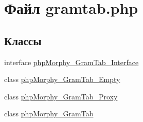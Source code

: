 \hypertarget{gramtab_8php}{
\section{Файл gramtab.php}
\label{gramtab_8php}
}
\subsection*{Классы}
\begin{DoxyCompactItemize}
\item 
interface \hyperlink{interfacephpMorphy__GramTab__Interface}{phpMorphy\_\-GramTab\_\-Interface}
\item 
class \hyperlink{classphpMorphy__GramTab__Empty}{phpMorphy\_\-GramTab\_\-Empty}
\item 
class \hyperlink{classphpMorphy__GramTab__Proxy}{phpMorphy\_\-GramTab\_\-Proxy}
\item 
class \hyperlink{classphpMorphy__GramTab}{phpMorphy\_\-GramTab}
\end{DoxyCompactItemize}
